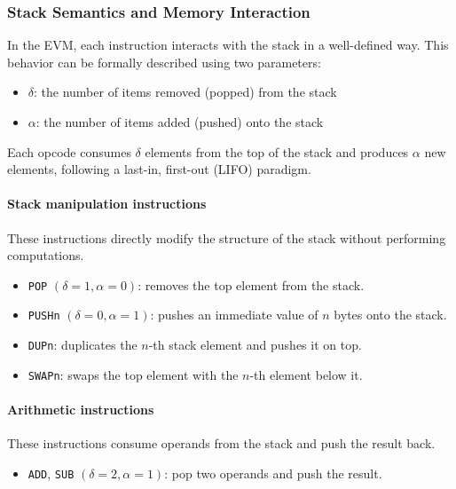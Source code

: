 \documentclass{scrbook}
\begin{document}
\subsubsection{Stack Semantics and Memory Interaction}

In the EVM, each instruction interacts with the stack in a well-defined way. This behavior can be formally described using two parameters:

\begin{itemize}
    \item $\delta$: the number of items removed (popped) from the stack
    \item $\alpha$: the number of items added (pushed) onto the stack
\end{itemize}

Each opcode consumes $\delta$ elements from the top of the stack and produces $\alpha$ new elements, following a last-in, first-out (LIFO) paradigm.

\paragraph{Stack manipulation instructions}
These instructions directly modify the structure of the stack without performing computations.

\begin{itemize}
    \item \texttt{POP} $(\delta = 1, \alpha = 0)$: removes the top element from the stack.
    \item \texttt{PUSHn} $(\delta = 0, \alpha = 1)$: pushes an immediate value of $n$ bytes onto the stack.
    \item \texttt{DUPn}: duplicates the $n$-th stack element and pushes it on top.
    \item \texttt{SWAPn}: swaps the top element with the $n$-th element below it.
\end{itemize}

\paragraph{Arithmetic instructions}
These instructions consume operands from the stack and push the result back.

\begin{itemize}
    \item \texttt{ADD}, \texttt{SUB} $(\delta = 2, \alpha = 1)$: pop two operands and push the result.
\end{itemize}
\end{document}
